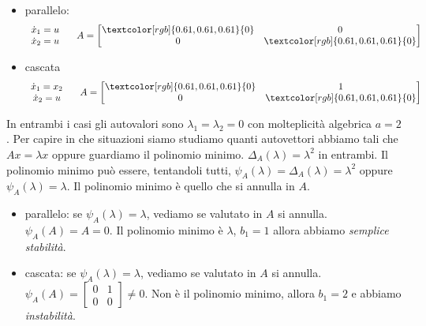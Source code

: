 \documentclass[10pt,a4paper]{book}
\begin{document}
\begin{itemize}
\item parallelo:\begin{equation*}
\begin{array}{ c }
\dot{x}_1 =u\\
\dot{x}_2 =u
\end{array} \ \ \ \ A=\begin{bmatrix}
\textcolor[rgb]{0.61,0.61,0.61}{0} & 0\\
0 & \textcolor[rgb]{0.61,0.61,0.61}{0}
\end{bmatrix}
\end{equation*}
\item cascata\begin{equation*}
\begin{array}{ c }
\dot{x}_1 =x_2\\
\dot{x}_2 =u
\end{array} \ \ \ \ A=\begin{bmatrix}
\textcolor[rgb]{0.61,0.61,0.61}{0} & 1\\
0 & \textcolor[rgb]{0.61,0.61,0.61}{0}
\end{bmatrix}
\end{equation*}
\end{itemize}

In entrambi i casi gli autovalori sono $\lambda _1 =\lambda _2 =0$ con molteplicità algebrica $a=2$. Per capire in che situazioni siamo studiamo quanti autovettori abbiamo tali che $Ax=\lambda x$ oppure guardiamo il polinomio minimo. $\Delta _A\left( \lambda \right) =\lambda ^{2}$ in entrambi. Il polinomio minimo può essere, tentandoli tutti, $\psi _A\left( \lambda \right) =\Delta _A\left( \lambda \right) =\lambda ^{2}$ oppure $\psi _A\left( \lambda \right) =\lambda $. Il polinomio minimo è quello che si annulla in $A$.
\begin{itemize}
\item parallelo: se $\psi _A\left( \lambda \right) =\lambda $, vediamo se valutato in $A$ si annulla. $\psi _A\left( A\right) =A=0$. Il polinomio minimo è $\lambda $, $b_1 =1$ allora abbiamo \textit{semplice stabilità}.
\item cascata: se $\psi _A\left( \lambda \right) =\lambda $, vediamo se valutato in $A$ si annulla. $\psi _A\left( A\right) =\begin{bmatrix}
0 & 1\\
0 & 0
\end{bmatrix} \neq 0$. Non è il polinomio minimo, allora $b_1 =2$ e abbiamo \textit{instabilità}.
\end{itemize}
\end{document}
